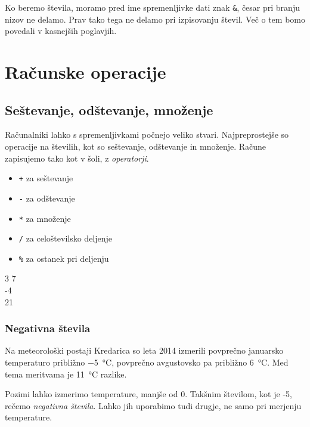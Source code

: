 \documentclass{book}
\begin{document}
\begin{errors}
Ko beremo števila, moramo pred ime spremenljivke dati znak \verb+&+, česar pri
branju nizov ne delamo. Prav tako tega ne delamo pri izpisovanju števil.
Več o tem bomo povedali v kasnejših poglavjih.
\end{errors}

\chapter{Računske operacije}

\section{Seštevanje, odštevanje, množenje}
Računalniki lahko s spremenljivkami počnejo veliko stvari. Najpreprostejše so  operacije na številih, kot so seštevanje, odštevanje in množenje. Račune zapisujemo tako kot v šoli, z \emph{operatorji}.
\begin{itemize}
	\item \verb-+- za seštevanje
	\item \verb+-+ za odštevanje
	\item \verb+*+ za množenje
	\item \verb+/+ za celoštevilsko deljenje
	\item \verb+%+ za ostanek pri deljenju
\end{itemize}

\begin{examples}

\begin{inout}
3 7
\\
-4\\
21
\end{inout}

\end{examples}

\subsection*{Negativna števila}
Na meteorološki postaji Kredarica so leta 2014 izmerili povprečno januarsko
temperaturo približno \qty{-5}{\celsius}, povprečno avgustovsko pa približno \qty{6}{\celsius}.
Med tema meritvama je \qty{11}{\celsius} razlike.

Pozimi lahko izmerimo temperature, manjše od 0.
Takšnim številom, kot je -5, rečemo \emph{negativna števila}.
Lahko jih uporabimo tudi drugje, ne samo pri merjenju temperature.
\end{document}
